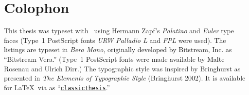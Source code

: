 \pagestyle{empty}

\hfill

\vfill


\section*{Colophon}
This thesis was typeset with \LaTeXe\ using Hermann Zapf's
{\emph{Palatino}} and {\emph{Euler}} type faces (Type~1 PostScript
fonts \emph{URW Palladio L} and \emph{FPL} were used). The listings
are typeset in \emph{Bera Mono}, originally developed by Bitstream,
Inc. as ``Bitstream Vera.''  (Type~1 PostScript fonts were made
available by Malte Rosenau and Ulrich Dirr.)  The typographic style
was inspired by Bringhurst as presented in \emph{The Elements of
Typographic Style} (Bringhurst 2002). It is available for \LaTeX\
via  as
``\href{http://www.ctan.org/tex-archive/macros/latex/contrib/classicthesis/}%
{\texttt{classicthesis}}.''

\bigskip

\noindent\finalVersionString




